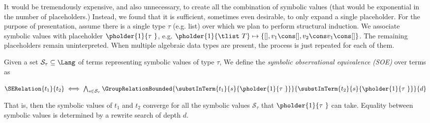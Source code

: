 It would be tremendously expensive, and also unnecessary, to create all the combination of symbolic values (that would be exponential in the number of placeholders.)
Instead, we found that it is sufficient, sometimes even desirable, to only expand a single placeholder.
For the purpose of presentation, assume there is a single type $\tau$ (e.g. list) over which we plan to
perform structural induction.
We associate symbolic values with placeholder $\pholder{1}{\tau~}$, e.g.
$\pholder{1}{\tlist~T} \mapsto \left\{[], v_1\cons [], v_2\cons v_1\cons []\right\}$.
The remaining placeholders remain uninterpreted.
When multiple algebraic data types are present, the process is just repeated for each of them.

\begin{definition}
\label{screening:serelation}
Given a set $\mathcal{S}_{\tau}\subseteq\Lang$ of terms representing symbolic values of type $\tau$,
We define the \emph{symbolic observational equivalence (SOE)} over terms as

\vspace{2pt}
\centering
$\SERelation{t_1}{t_2} \iff \bigwedge_{s\in\mathcal{S}_{\tau}} 
    \GroupRelationBounded{\substInTerm{t_1}{s}{\pholder{1}{\tau~}}}
                         {\substInTerm{t_2}{s}{\pholder{1}{\tau~}}}{d}$
\end{definition}

That is, then the symbolic values of $t_1$ and $t_2$ converge for all the symbolic values $\mathcal{S}_{\tau}$ that $\pholder{1}{\tau~}$ can take.
Equality between symbolic values is determined by a rewrite search of depth $d$.

